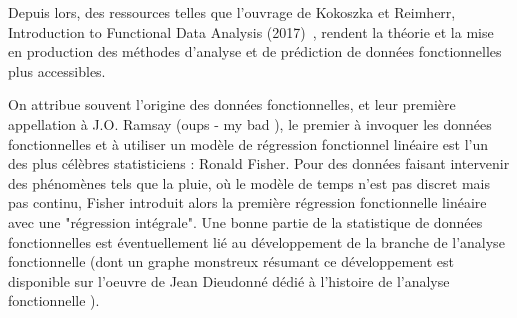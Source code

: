 \bigskip

Depuis lors, des ressources telles que l'ouvrage de Kokoszka et Reimherr, \textcolor{flatuicolors_blue_devil}{Introduction to Functional Data Analysis (2017)}~\cite{kokoszka2017introduction}, rendent la théorie et la mise en production des méthodes d'analyse et de prédiction de données fonctionnelles plus accessibles.

\bigskip

\noindent{}

\begin{leftbar}
    On attribue souvent l'origine des données fonctionnelles, et leur première appellation à J.O. Ramsay (oups - my bad  ), le premier à invoquer les données fonctionnelles et à utiliser un modèle de régression fonctionnel linéaire est l'un des plus célèbres statisticiens : Ronald Fisher. Pour des données faisant intervenir des phénomènes tels que la pluie, où le modèle de temps n'est pas discret mais pas continu, Fisher introduit alors la première régression fonctionnelle linéaire avec une "régression intégrale". Une bonne partie de la statistique de données fonctionnelles est éventuellement lié au développement de la branche de l'analyse fonctionnelle (dont un graphe monstreux résumant ce développement est disponible sur l'oeuvre de Jean Dieudonné dédié à l'histoire de l'analyse fonctionnelle ).
\end{leftbar}

\bigskip

